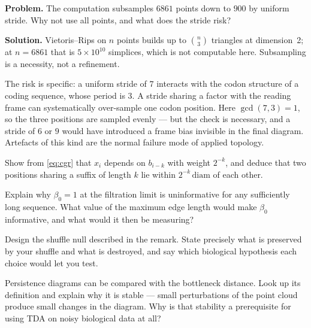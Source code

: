 \begin{worked}
\textbf{Problem.} The computation subsamples $6861$ points down to $900$ by
uniform stride. Why not use all points, and what does the stride risk?

\textbf{Solution.} Vietoris--Rips on $n$ points builds up to $\binom{n}{3}$
triangles at dimension~2; at $n = 6861$ that is $5\times10^{10}$ simplices, which
is not computable here. Subsampling is a necessity, not a refinement.

The risk is specific: a uniform stride of $7$ interacts with the codon structure
of a coding sequence, whose period is $3$. A stride sharing a factor with the
reading frame can systematically over-sample one codon position. Here
$\gcd(7, 3) = 1$, so the three positions are sampled evenly --- but the check is
necessary, and a stride of $6$ or $9$ would have introduced a frame bias
invisible in the final diagram. Artefacts of this kind are the normal failure
mode of applied topology.
\end{worked}

\begin{exercise}
Show from \eqref{eq:cgr} that $x_i$ depends on $b_{i-k}$ with weight $2^{-k}$,
and deduce that two positions sharing a suffix of length $k$ lie within
$2^{-k}\,\mathrm{diam}$ of each other.
\end{exercise}

\begin{exercise}
Explain why $\beta_0 = 1$ at the filtration limit is uninformative for any
sufficiently long sequence. What value of the maximum edge length would make
$\beta_0$ informative, and what would it then be measuring?
\end{exercise}

\begin{exercise}
Design the shuffle null described in the remark. State precisely what is
preserved by your shuffle and what is destroyed, and say which biological
hypothesis each choice would let you test.
\end{exercise}

\begin{exercise}[(harder)]
Persistence diagrams can be compared with the bottleneck distance. Look up its
definition and explain why it is stable --- small perturbations of the point
cloud produce small changes in the diagram. Why is that stability a prerequisite
for using TDA on noisy biological data at all?
\end{exercise}

